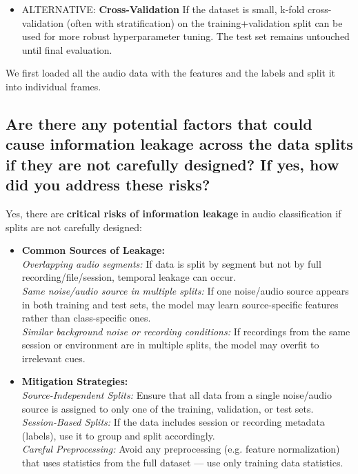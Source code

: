 \begin{itemize}
	\item \uppercase{Alternative: } {\bf Cross-Validation} If the dataset is small, k-fold cross-validation (often with stratification) on the training+validation split can be used for more robust hyperparameter tuning. The test set remains untouched until final evaluation.
\end{itemize}


We first loaded all the audio data with the features and the labels and split it into individual frames. 




\subsection{Are there any potential factors that could cause information leakage across the data splits if they are not carefully designed? If yes, how did you address these risks?}
Yes, there are {\bf critical risks of information leakage} in audio classification if splits are not carefully designed:


\label{sec:Data Split:b}

\begin{itemize}
	\item {\bf Common Sources of Leakage: } \\
		{\it Overlapping audio segments: } If data is split by segment but not by full recording/file/session, temporal leakage can occur. \\
		{\it Same noise/audio source in multiple splits: } If one noise/audio source appears in both training and test sets, the model may learn source-specific features rather than class-specific ones. \\
		{\it Similar background noise or recording conditions: } If recordings from the same session or environment are in multiple splits, the model may overfit to irrelevant cues. 
	
	\item {\bf Mitigation Strategies: } \\
		{\it Source-Independent Splits:} Ensure that all data from a single noise/audio source is assigned to only one of the training, validation, or test sets. \\
		{\it Session-Based Splits:} If the data includes session or recording metadata (labels), use it to group and split accordingly. \\
		{\it Careful Preprocessing:} Avoid any preprocessing (e.g. feature normalization) that uses statistics from the full dataset — use only training data statistics. 
\end{itemize}



